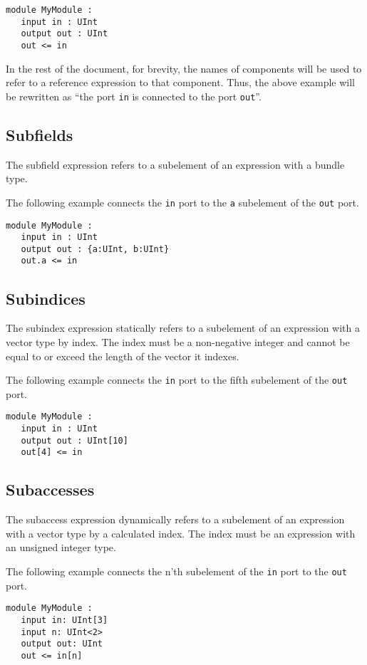 \documentclass[12pt]{article}
\begin{document}
\begin{verbatim}
module MyModule :
   input in : UInt
   output out : UInt
   out <= in
\end{verbatim}

In the rest of the document, for brevity, the names of components will be used to refer to a reference expression to that component. Thus, the above example will be rewritten as ``the port \verb|in| is connected to the port \verb|out|''.

\subsection{Subfields}
The subfield expression refers to a subelement of an expression with a bundle type.

The following example connects the \verb|in| port to the \verb|a| subelement of the \verb|out| port. 
\begin{verbatim}
module MyModule :
   input in : UInt
   output out : {a:UInt, b:UInt}
   out.a <= in
\end{verbatim}

\subsection{Subindices}
The subindex expression statically refers to a subelement of an expression with a vector type by index. The index must be a non-negative integer and cannot be equal to or exceed the length of the vector it indexes.

The following example connects the \verb|in| port to the fifth subelement of the \verb|out| port. 
\begin{verbatim}
module MyModule :
   input in : UInt
   output out : UInt[10]
   out[4] <= in
\end{verbatim}

\subsection{Subaccesses}
The subaccess expression dynamically refers to a subelement of an expression with a vector type by a calculated index. The index must be an expression with an unsigned integer type.

The following example connects the n'th subelement of the \verb|in| port to the \verb|out| port.
\begin{verbatim}
module MyModule :
   input in: UInt[3]
   input n: UInt<2>
   output out: UInt
   out <= in[n]
\end{verbatim}
\end{document}
